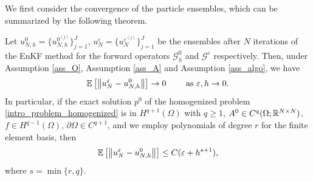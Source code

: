 \documentclass[10pt]{article}
\begin{document}
We first consider the convergence of the particle ensembles, which can be summarized by the following theorem.
\begin{theorem} \label{convergence_result_full}
Let $u_{N,h}^0 = \{ u_{N,h}^{0^{(j)}} \}_{j=1}^J$, $u_N^{\varepsilon} = \{ u_N^{\varepsilon^{(j)}} \}_{j=1}^J$ be the ensembles after $N$ iterations of the EnKF method for the forward operators $\mathcal{G}^0_h$ and $\mathcal{G}^{\varepsilon}$ respectively.
Then, under Assumption \ref{ass_O}, Assumption \ref{ass_A} and Assumption \ref{ass_algo}, we have
\begin{equation*}
\mathbb{E} \left [ \left\|u_N^{\varepsilon} - u_{N,h}^0\right\| \right ] \to 0 \qquad \text{ as } \varepsilon, h \to 0.
\end{equation*}
In particular, if the exact solution $p^0$ of the homogenized problem \eqref{intro_problem_homogenized} is in $H^{q+1}(\Omega)$ with $q \ge 1$, $A^0 \in C^q(\Omega;\mathbb{R}^{N \times N})$, $f \in H^{q-1}(\Omega)$, $\partial \Omega \in C^{q+1}$, and we employ polynomials of degree $r$ for the finite element basis, then
\begin{equation*}
\mathbb{E} \left [ \left\|u_N^{\varepsilon} - u_{N,h}^0\right\| \right ] \le C ( \varepsilon + h^{s+1} ),
\end{equation*}
where $s = \min \{ r, q \}$.
\end{theorem}
\end{document}
